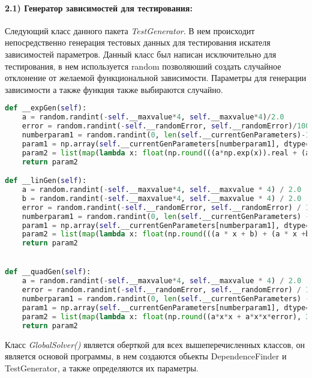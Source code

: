     \paragraph{2.1) Генератор зависимостей для тестирования:
    \\
    }
    Следующий класс данного пакета \textit{TestGenerator}. В нем происходит непосредственно генерация тестовых данных для тестирования искателя зависимостей параметров. Данный класс был написан исключительно для тестирования, в нем используется random позволяюший создать случайное отклонение от желаемой функциональной зависимости. Параметры для генерации зависимости а также функция также выбираются случайно.\\

    \begin{lstlisting}[language=Python]
def __expGen(self):
    a = random.randint(-self.__maxvalue*4, self.__maxvalue*4)/2.0
    error = random.randint(-self.__randomError, self.__randomError)/100.0
    numberparam1 = random.randint(0, len(self.__currentGenParameters)-1)
    param1 = np.array(self.__currentGenParameters[numberparam1], dtype=np.float128)
    param2 = list(map(lambda x: float(np.round(((a*np.exp(x)).real + (a*np.exp(x)*error).real), 3)), param1))
    return param2

def __linGen(self):
    a = random.randint(-self.__maxvalue*4, self.__maxvalue * 4) / 2.0
    b = random.randint(-self.__maxvalue*4, self.__maxvalue * 4) / 2.0
    error = random.randint(-self.__randomError, self.__randomError) / 100.0
    numberparam1 = random.randint(0, len(self.__currentGenParameters) - 1)
    param1 = np.array(self.__currentGenParameters[numberparam1], dtype=np.float128)
    param2 = list(map(lambda x: float(np.round(((a * x + b) + (a * x +b) * error), 3)), param1))
    return param2


def __quadGen(self):
    a = random.randint(-self.__maxvalue*4, self.__maxvalue * 4) / 2.0
    error = random.randint(-self.__randomError, self.__randomError) / 100.0
    numberparam1 = random.randint(0, len(self.__currentGenParameters) - 1)
    param1 = np.array(self.__currentGenParameters[numberparam1], dtype=np.float128)
    param2 = list(map(lambda x: float(np.round((a*x*x + a*x*x*error), 3)), param1))
    return param2
    \end{lstlisting}

    Класс \textit{GlobalSolver()} является оберткой для всех вышеперечисленных классов, он является основой программы, в нем создаются обьекты DependenceFinder и TestGenerator, а также определяются их параметры.\\

